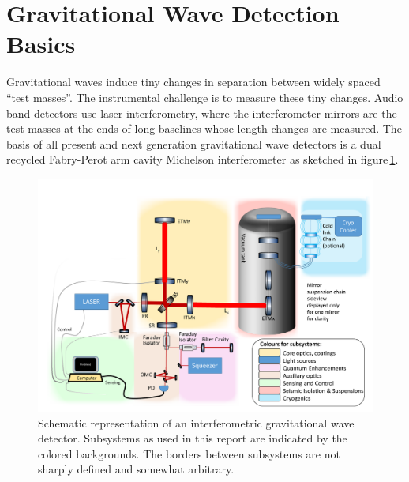 \section{Gravitational Wave Detection Basics}
Gravitational waves induce tiny changes in separation between widely spaced “test masses”. The instrumental challenge is to measure these tiny changes. Audio band detectors use laser interferometry, where the interferometer mirrors are the test masses at the ends of long baselines whose length changes are measured. The basis of all present and next generation gravitational wave detectors is a dual recycled Fabry-Perot arm cavity Michelson interferometer as sketched in figure\,\ref{fig:ifo_layout}. 
\begin{figure}[ht]
\includegraphics*[width=\textwidth]{Figures/InterferometerSchematicSubsystemColour.pdf}
\caption{Schematic representation of an interferometric gravitational wave detector. Subsystems as used in this report are indicated by the colored backgrounds. The borders between subsystems are not sharply defined and somewhat arbitrary.}
\label{fig:ifo_layout}
\end{figure}

